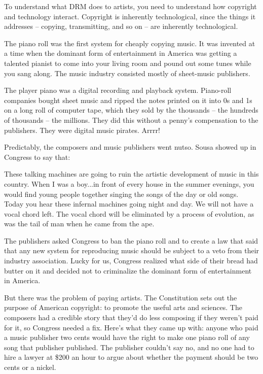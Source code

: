 To understand what DRM does to artists, you need to understand how
copyright and technology interact. Copyright is inherently
technological, since the things it addresses -- copying,
transmitting, and so on -- are inherently technological.

The piano roll was the first system for cheaply copying music. It
was invented at a time when the dominant form of entertainment in
America was getting a talented pianist to come into your living
room and pound out some tunes while you sang along. The music
industry consisted mostly of sheet-music publishers.

The player piano was a digital recording and playback system.
Piano-roll companies bought sheet music and ripped the notes
printed on it into 0s and 1s on a long roll of computer tape, which
they sold by the thousands -- the hundreds of thousands -- the
millions. They did this without a penny's compensation to the
publishers. They were digital music pirates. Arrrr!

Predictably, the composers and music publishers went nutso. Sousa
showed up in Congress to say that:

These talking machines are going to ruin the artistic development
of music in this country. When I was a boy...in front of every
house in the summer evenings, you would find young people together
singing the songs of the day or old songs. Today you hear these
infernal machines going night and day. We will not have a vocal
chord left. The vocal chord will be eliminated by a process of
evolution, as was the tail of man when he came from the ape.

The publishers asked Congress to ban the piano roll and to create a
law that said that any new system for reproducing music should be
subject to a veto from their industry association. Lucky for us,
Congress realized what side of their bread had butter on it and
decided not to criminalize the dominant form of entertainment in
America.

But there was the problem of paying artists. The Constitution sets
out the purpose of American copyright: to promote the useful arts
and sciences. The composers had a credible story that they'd do
less composing if they weren't paid for it, so Congress needed a
fix. Here's what they came up with: anyone who paid a music
publisher two cents would have the right to make one piano roll of
any song that publisher published. The publisher couldn't say no,
and no one had to hire a lawyer at \$200 an hour to argue about
whether the payment should be two cents or a nickel.

